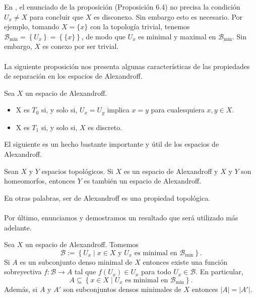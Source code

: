 {\color[HTML]{188539}
En \cite{jafarian2013}, el enunciado de la proposición (Proposición 6.4) no precisa la condición $U_x\ne X$ para concluir que $X$ es disconexo. Sin embargo esto es necesario. Por ejemplo, tomando $X=\{x\}$ con la topología trivial, tenemos $\mathcal{B}_{\operatorname{min}}=\left\lbrace U_x\right\rbrace=\left\lbrace\{x\}\right\rbrace$, de modo que $U_x$ es minimal y maximal en $\mathcal{B}_{\operatorname{min}}$. Sin embargo, $X$ es conexo por ser trivial.}\\\\
La siguiente proposición nos presenta algunas características de las propiedades de separación en los espacios de Alexandroff.
\begin{Prop}\label{Prop:Separacion_Alexandroff}
   Sea $X$ un espacio de Alexandroff.
   \begin{itemize}
      \item X es $T_0$ si, y solo si, $U_x=U_y$ implica $x=y$ para cualesquiera $x,y\in X$.
      \item X es $T_1$ si, y solo si, $X$ es discreto.
   \end{itemize}
\end{Prop}
El siguiente es un hecho bastante importante y útil de los espacios de Alexandroff.
\begin{Prop}
   Sean $X$ y $Y$ espacios topológicos. Si $X$ es un espacio de Alexandroff y $X$ y $Y$ son homeomorfos, entonces $Y$ es también un espacio de Alexandroff. 
\end{Prop}
En otras palabras, ser de Alexandroff es una propiedad topológica.\\\\
Por último, enunciamos y demostramos un resultado que será utilizado más adelante.
\begin{Prop}\label{Prop:cardinal_densos_minimales}
   Sea $X$ un espacio de Alexandroff. Tomemos 
   $$
   \mathcal{B}:=\left\lbrace U_x\mid x\in X \text{ y }U_x\text{ es minimal en }\mathcal{B}_{\min}\right\rbrace.
   $$
   Si $A$ es un subconjunto denso minimal de $X$ entonces existe una función sobreyectiva $f:\mathcal{B}\to A$ tal que $f\left( U_x\right)\in U_x$ para todo $U_x\in \mathcal{B}$. En particular,
         $$
         A\subseteq\left\lbrace x\in X\mid U_x \text{ es minimal en }\mathcal{B}_{\min}\right\rbrace.
         $$
   Además, si $A$ y $A'$ son subconjuntos densos minimales de $X$ entonces $|A|=|A'|$.
\end{Prop}
